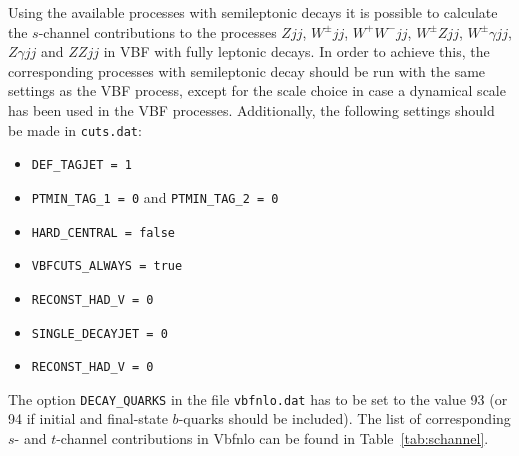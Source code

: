 \documentclass[english,12pt]{article}
\begin{document}
Using the available processes with semileptonic decays it is possible to calculate the $s$-channel
contributions to the processes $Zjj$, $W^\pm jj$, $W^+W^-jj$, $W^\pm
Zjj$, $W^\pm\gamma jj$, $Z\gamma jj$
and $ZZjj$ in VBF with fully leptonic decays.
In order to achieve this, the corresponding processes with semileptonic decay should be
run with the same settings as the VBF process, except for the scale choice in case a 
dynamical scale has been used in the VBF processes.
Additionally, the following settings should be made in {\tt cuts.dat}:
\begin{itemize}
 \item {\tt DEF\_TAGJET = 1}
 \item {\tt PTMIN\_TAG\_1 = 0} and {\tt PTMIN\_TAG\_2 = 0}
 \item {\tt HARD\_CENTRAL = false}
 \item {\tt VBFCUTS\_ALWAYS = true}
 \item {\tt RECONST\_HAD\_V = 0}
 \item {\tt SINGLE\_DECAYJET = 0}
 \item {\tt RECONST\_HAD\_V = 0}
\end{itemize}
The option {\tt DECAY\_QUARKS} in the file {\tt vbfnlo.dat} has to be set to the value 93 (or 94
if initial and final-state $b$-quarks should be included).
The list of corresponding $s$- and $t$-channel contributions in {\sc Vbfnlo} can be found in Table~\ref{tab:schannel}.
\end{document}
